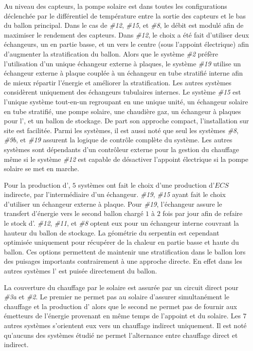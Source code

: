 Au niveau des capteurs, la pompe solaire est dans toutes les configurations déclenchée par
le différentiel de température entre la sortie des capteurs et le bas du ballon principal.
Dans le cas de \emph{\#12}, \emph{\#15}, et \emph{\#8}, le débit est modulé afin de
maximiser le rendement des capteurs. Dans \emph{\#12}, le choix a été fait d’utiliser deux
échangeurs, un en partie basse, et un vers le centre (sous l’appoint électrique) afin
d’augmenter la stratification du ballon. Alors que le système \emph{\#2} préfère
l’utilisation d’un unique échangeur externe à plaques, le système \emph{\#19} utilise un
échangeur externe à plaque couplée à un échangeur en tube stratifié interne afin de mieux
répartir l’énergie et améliorer la stratification. Les autres systèmes considèrent
uniquement des échangeurs tubulaires internes.
Le système \emph{\#15} est l’unique système tout-en-un regroupant en une unique unité,
un échangeur solaire en tube stratifié, une pompe solaire,
une chaudière gaz, un échangeur à plaques pour l’, et un ballon de stockage.
De part son approche compact, l’installation sur site est facilitée.
Parmi les systèmes, il est aussi noté que seul les systèmes \emph{\#8}, \emph{\#9b},
et \emph{\#19} assurent la logique de contrôle complète du système. Les autres systèmes
sont dépendants d’un contrôleur externe pour la gestion du chauffage même si le système
\emph{\#12} est capable de désactiver l’appoint électrique si la pompe solaire se met en marche.

Pour la production d’, $5$ systèmes ont fait le choix d’une production
d’$ECS$ indirecte, par l’intermédiaire d’un échangeur. \emph{\#19}, \emph{\#15} ayant fait le
choix d’utiliser un échangeur externe à plaque. Pour \emph{\#19}, l’échangeur
assure le transfert d’énergie vers le second ballon chargé $1$ à $2$ fois par jour afin
de refaire le stock d’. \emph{\#12}, \emph{\#11}, et \emph{\#8} optent eux pour
un échangeur interne couvrant la hauteur du ballon de stockage. La géométrie
du serpentin est cependant optimisée uniquement pour récupérer de la chaleur en
partie basse et haute du ballon. Ces options permettent de maintenir une
stratification dans le ballon lors des puisages importants contrairement à une approche
directe. En effet dans les autres systèmes l’ est puisée directement du ballon.

La couverture du chauffage par le solaire est assurée par un circuit direct pour
\emph{\#3a} et \emph{\#2}. Le premier ne permet pas au solaire d’assurer simultanément
le chauffage et la production d’ alors que le second ne permet pas de fournir
aux émetteurs de l’énergie provenant en même temps de l’appoint et du solaire.
Les $7$ autres systèmes s’orientent eux vers un chauffage indirect uniquement. Il est noté
qu’aucuns des systèmes étudié ne permet l’alternance entre chauffage direct et indirect.

